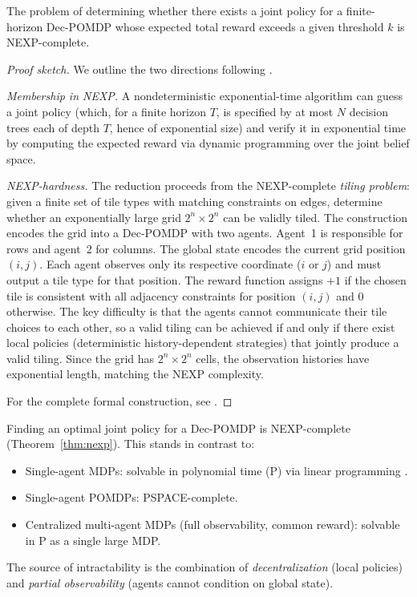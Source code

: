 \documentclass[11pt,a4paper]{article}
\begin{document}
\begin{theorem}
\label{thm:nexp}
The problem of determining whether there exists a joint policy for
a finite-horizon Dec-POMDP whose expected total reward exceeds a
given threshold $k$ is NEXP-complete.
\end{theorem}

\begin{proof}[Proof sketch]
We outline the two directions following \citet{bernstein2002}.

\emph{Membership in NEXP.}  A nondeterministic exponential-time
algorithm can guess a joint policy (which, for a finite horizon
$T$, is specified by at most $N$ decision trees each of depth $T$,
hence of exponential size) and verify it in exponential time by
computing the expected reward via dynamic programming over the
joint belief space.

\emph{NEXP-hardness.}  The reduction proceeds from the
NEXP-complete \emph{tiling problem}: given a finite set of tile
types with matching constraints on edges, determine whether an
exponentially large grid $2^n \times 2^n$ can be validly tiled.
The construction encodes the grid into a Dec-POMDP with two agents.
Agent~1 is responsible for rows and agent~2 for columns.  The
global state encodes the current grid position $(i, j)$.  Each
agent observes only its respective coordinate ($i$ or $j$) and
must output a tile type for that position.  The reward function
assigns $+1$ if the chosen tile is consistent with all adjacency
constraints for position $(i, j)$ and $0$ otherwise.  The key
difficulty is that the agents cannot communicate their tile
choices to each other, so a valid tiling can be achieved if and
only if there exist local policies (deterministic history-dependent
strategies) that jointly produce a valid tiling.  Since the grid
has $2^n \times 2^n$ cells, the observation histories have
exponential length, matching the NEXP complexity.

For the complete formal construction, see \citet[Theorem~3.1]{bernstein2002}.
\end{proof}

\begin{keyresult}[title={Computational Intractability of Dec-POMDPs}]
Finding an optimal joint policy for a Dec-POMDP is NEXP-complete
(Theorem~\ref{thm:nexp}).  This stands in contrast to:
\begin{itemize}[nosep]
  \item Single-agent MDPs: solvable in polynomial time (P) via
    linear programming \citep{puterman2014}.
  \item Single-agent POMDPs: PSPACE-complete.
  \item Centralized multi-agent MDPs (full observability, common
    reward): solvable in P as a single large MDP.
\end{itemize}
The source of intractability is the combination of
\emph{decentralization} (local policies) and \emph{partial
observability} (agents cannot condition on global state).
\end{keyresult}
\end{document}

